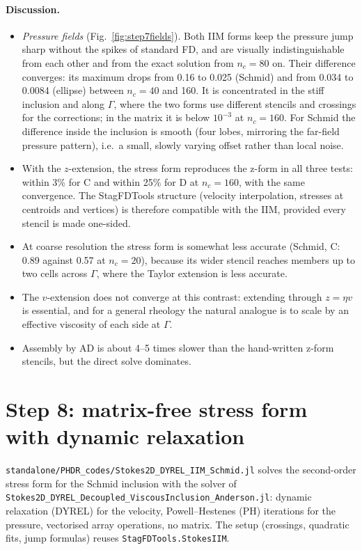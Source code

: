 \documentclass[11pt,a4paper]{article}
\newcommand{\code}[1]{\texttt{#1}}
\begin{document}
\paragraph{Discussion.}
\begin{itemize}
  \item \emph{Pressure fields} (Fig.~\ref{fig:step7fields}). Both IIM forms keep the pressure
    jump sharp without the spikes of standard FD, and are visually indistinguishable from each
    other and from the exact solution from $n_c=80$ on. Their difference converges: its maximum
    drops from 0.16 to 0.025 (Schmid) and from 0.034 to 0.0084 (ellipse) between $n_c=40$ and
    160. It is concentrated in the stiff inclusion and along $\Gamma$, where the two forms
    use different stencils and crossings for the corrections; in the matrix it is below
    $10^{-3}$ at $n_c=160$. For Schmid the difference inside the inclusion is smooth (four
    lobes, mirroring the far-field pressure pattern), i.e.\ a small, slowly varying offset
    rather than local noise.
  \item With the $z$-extension, the stress form reproduces the z-form in all three tests:
    within 3\% for C and within 25\% for D at $n_c=160$, with the same convergence. The
    StagFDTools structure (velocity interpolation, stresses at centroids and vertices) is
    therefore compatible with the IIM, provided every stencil is made one-sided.
  \item At coarse resolution the stress form is somewhat less accurate (Schmid, C: 0.89 against
    0.57 at $n_c=20$), because its wider stencil reaches members up to two cells across
    $\Gamma$, where the Taylor extension is less accurate.
  \item The $v$-extension does not converge at this contrast: extending through $z=\eta v$ is
    essential, and for a general rheology the natural analogue is to scale by an effective
    viscosity of each side at $\Gamma$.
  \item Assembly by AD is about 4--5 times slower than the hand-written z-form stencils, but the
    direct solve dominates.
\end{itemize}

\section{Step 8: matrix-free stress form with dynamic relaxation}\label{sec:s8}

\code{standalone/PHDR\_codes/Stokes2D\_DYREL\_IIM\_Schmid.jl} solves the second-order stress form
for the Schmid inclusion with the solver of
\code{Stokes2D\_DYREL\_Decoupled\_ViscousInclusion\_Anderson.jl}: dynamic relaxation (DYREL) for
the velocity, Powell--Hestenes (PH) iterations for the pressure, vectorised array operations, no
matrix. The setup (crossings, quadratic fits, jump formulas) reuses \code{StagFDTools.StokesIIM}.
\end{document}
